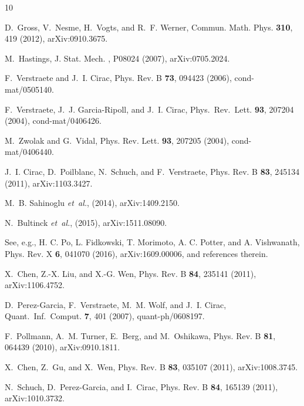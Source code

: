 \documentclass[pra,twocolumn,nofootinbib,superscriptaddress]{revtex4-1}
\begin{document}
\begin{thebibliography}{10}

	D.~{Gross}, V.~{Nesme}, H.~{Vogts}, and R.~F. {Werner},
	\newblock Commun. Math. Phys. {\bf 310}, 419 (2012), arXiv:0910.3675.

	M.~Hastings,
	\newblock J. Stat. Mech. , P08024 (2007), arXiv:0705.2024.

	F.~Verstraete and J.~I. Cirac,
	\newblock Phys. Rev. B {\bf 73}, 094423 (2006), cond-mat/0505140.

	F.~Verstraete, J.~J. Garcia-Ripoll, and J.~I. Cirac,
	\newblock Phys.\ Rev.\ Lett. {\bf 93}, 207204 (2004), cond-mat/0406426.

	M.~Zwolak and G.~Vidal,
	\newblock Phys. Rev. Lett. {\bf 93}, 207205 (2004), cond-mat/0406440.

	J.~I. Cirac, D.~Poilblanc, N.~Schuch, and F.~Verstraete,
	\newblock Phys. Rev. B {\bf 83}, 245134 (2011), arXiv:1103.3427.

	M.~B. Sahinoglu {\em et~al.},
	\newblock (2014), arXiv:1409.2150.

	N.~{Bultinck} {\em et~al.},
	\newblock (2015), arXiv:1511.08090.

	See, e.g., H. C. Po, L. Fidkowski, T. Morimoto, A. C. Potter, and A.
	Vishwanath, Phys. Rev. X \textbf{6}, 041070 (2016), arXiv:1609.00006, and
	references therein.

	X.~Chen, Z.-X. Liu, and X.-G. Wen,
	\newblock Phys. Rev. B {\bf 84}, 235141 (2011), arXiv:1106.4752.

	D.~Perez-Garcia, F.~Verstraete, M.~M. Wolf, and J.~I. Cirac,
	\newblock Quant.\ Inf.\ Comput. {\bf 7}, 401 (2007), quant-ph/0608197.

	F.~{Pollmann}, A.~M. {Turner}, E.~{Berg}, and M.~{Oshikawa},
	\newblock Phys. Rev. B {\bf 81}, 064439 (2010), arXiv:0910.1811.

	X.~{Chen}, Z.~{Gu}, and X.~{Wen},
	\newblock Phys. Rev. B {\bf 83}, 035107 (2011), arXiv:1008.3745.

	N.~{Schuch}, D.~{Perez-Garcia}, and I.~{Cirac},
	\newblock Phys. Rev. B {\bf 84}, 165139 (2011), arXiv:1010.3732.


\end{thebibliography}
\end{document}
